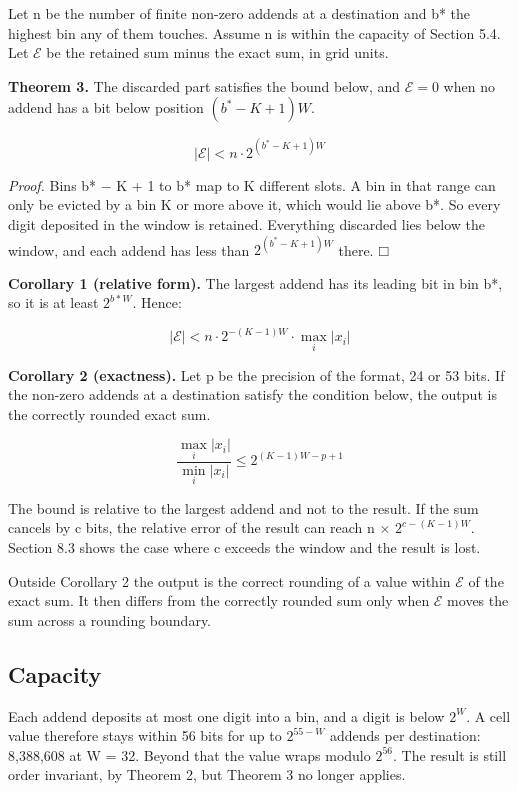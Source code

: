 \documentclass[3p,10pt]{elsarticle}
\begin{document}
Let n be the number of finite non-zero addends at a destination and b*
the highest bin any of them touches. Assume n is within the capacity of
Section 5.4. Let \(\mathcal{E}\) be the retained sum minus the exact
sum, in grid units.

\textbf{Theorem 3.} The discarded part satisfies the bound below, and
\(\mathcal{E}=0\) when no addend has a bit below position
\((b^*-K+1)W\).

\[|\mathcal{E}| < n\cdot 2^{(b^*-K+1)W}\]

\emph{Proof.} Bins b* − K + 1 to b* map to K different slots. A bin in
that range can only be evicted by a bin K or more above it, which would
lie above b*. So every digit deposited in the window is retained.
Everything discarded lies below the window, and each addend has less
than \(2^{(b^*-K+1)W}\) there. \hfill$\mdlgwhtsquare$

\textbf{Corollary 1 (relative form).} The largest addend has its leading
bit in bin b*, so it is at least \(2^{b*W}\). Hence:

\[|\mathcal{E}| < n\cdot 2^{-(K-1)W}\cdot \max_i |x_i|\]

\textbf{Corollary 2 (exactness).} Let p be the precision of the format,
24 or 53 bits. If the non-zero addends at a destination satisfy the
condition below, the output is the correctly rounded exact sum.

\[\frac{\max_i |x_i|}{\min_i |x_i|} \le 2^{(K-1)W-p+1}\]

The bound is relative to the largest addend and not to the result. If
the sum cancels by c bits, the relative error of the result can reach n
× \(2^{c-(K-1)W}\). Section 8.3 shows the case where c exceeds the
window and the result is lost.

Outside Corollary 2 the output is the correct rounding of a value within
\(\mathcal{E}\) of the exact sum. It then differs from the correctly
rounded sum only when \(\mathcal{E}\) moves the sum across a rounding
boundary.

\hypertarget{capacity}{%
\subsection{Capacity}\label{capacity}}

Each addend deposits at most one digit into a bin, and a digit is below
\(2^W\). A cell value therefore stays within 56 bits for up to
\(2^{55−W}\) addends per destination: 8,388,608 at W = 32. Beyond that
the value wraps modulo \(2^{56}\). The result is still order invariant,
by Theorem 2, but Theorem 3 no longer applies.
\end{document}
